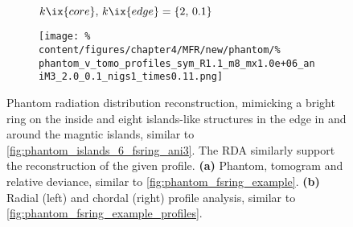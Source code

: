             \begin{figure}%
                \centering%
                \begin{subfigure}{\textwidth}%
                    \centering%
                    \caption{$k\ix{core},\,k\ix{edge}=\left\{2,\,0.1\right\}$}%
                \end{subfigure}%
                \newline%
                \begin{subfigure}{\textwidth}%
                    \centering%
                    \texttt{[image: \%
                        content/figures/chapter4/MFR/new/phantom/\%
                        phantom\_v\_tomo\_profiles\_sym\_R1.1\_m8\_mx1.0e+06\_aniM3\_2.0\_0.1\_nigs1\_times0.11.png]}%
                    \caption{}%
                \end{subfigure}%
                \caption{Phantom radiation distribution reconstruction, mimicking a bright ring on the inside and eight islands-like structures in the edge in and around the magntic islands, similar to \cref{fig:phantom_islands_6_fsring_ani3}. The RDA similarly support the reconstruction of the given profile. \textbf{(a)} Phantom, tomogram and relative deviance, similar to \cref{fig:phantom_fsring_example}. \textbf{(b)} Radial (left) and chordal (right) profile analysis, similar to \cref{fig:phantom_fsring_example_profiles}.}\label{fig:phantom_islands_8}%
            \end{figure}%
%